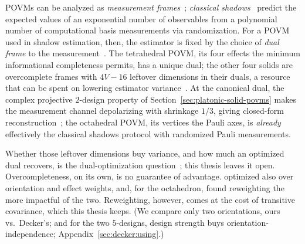 \documentclass[11pt, oneside, openany]{scrbook}
\begin{document}
POVMs can be analyzed as \textit{measurement frames}~\cite{scott2006tightinformationallycomplete,innocenti2023shadowtomographygeneral}; \textit{classical shadows}~\cite{huang2020predictingmanyproperties} predict the expected values of an exponential number of observables from a polynomial number of computational basis measurements via randomization. For a POVM used in shadow estimation, then, the estimator is fixed by the choice of \textit{dual frame} to the measurement~\cite{innocenti2023shadowtomographygeneral}. The tetrahedral POVM, its four effects the minimum informational completeness permits, has a unique dual; the other four solids are overcomplete frames with $4V - 16$ leftover dimensions in their duals, a resource that can be spent on lowering estimator variance~\cite{malmi2024enhancedobservableestimation,fischer2024dualframeoptimizationinformationally,caprotti2024optimizingquantumtomography}. At the canonical dual, the complex projective $2$-design property of Section~\ref{sec:platonic-solid-povms} makes the measurement channel depolarizing with shrinkage $1/3$, giving closed-form reconstruction~\cite{nguyen2022optimisingshadowtomography}; the octahedral POVM, its vertices the Pauli axes, is \textit{already} effectively the classical shadows protocol with randomized Pauli measurements.

Whether those leftover dimensions buy variance, and how much an optimized dual recovers, is the dual-optimization question~\cite{innocenti2023shadowtomographygeneral,korhonen2025improvingshadowestimation,caprotti2026postprocessingoptimizationoptimal,mangini2025lowvarianceestimationsa,melegari2026exploitingovercompletenessplatonicsolid}; this thesis leaves it open. Overcompleteness, on its own, is no guarantee of advantage. \textcite{melegari2026exploitingovercompletenessplatonicsolid} optimized also over orientation and effect weights, and, for the octahedron, found reweighting the more impactful of the two. Reweighting, however, comes at the cost of transitive covariance, which this thesis keeps. (We compare only two orientations, ours vs.\ Decker's; and for the two $5$-designs, design strength buys orientation-independence; Appendix~\ref{sec:decker:using}.)
\end{document}
